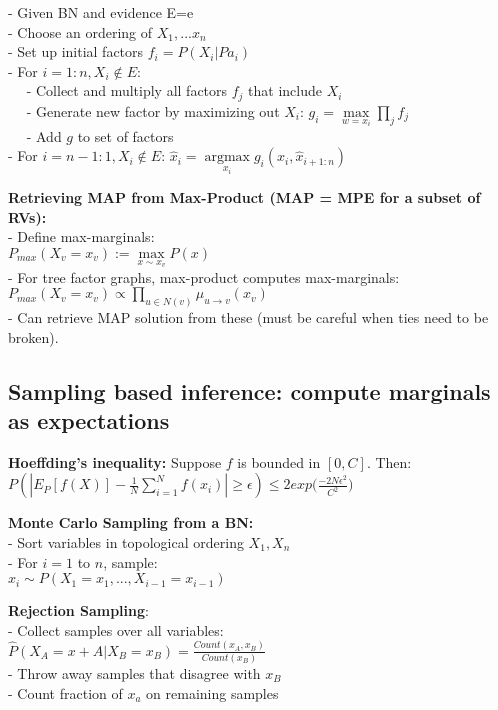 \iffalse
- Given BN and evidence E=e\\
- Choose an ordering of $X_1, ... x_n$\\
- Set up initial factors $f_i=P(X_i|Pa_i)$\\
- For $i=1:n, X_i \notin  E$:\\
$\quad$ - Collect and multiply all factors $f_j$ that include $X_i$\\
$\quad$ - Generate new factor by maximizing out $X_i$:
        $g_i=\underset{w=x_i}{\operatorname{max}}\prod_j f_j$\\
$\quad$ - Add $g$ to set of factors\\
- For $i=n-1:1, X_i\notin E$:
    $\hat{x}_i=\underset{x_i}{\operatorname{argmax}}g_i(x_i, \hat{x}_{i+1:n})$

\textbf{Retrieving MAP from Max-Product (MAP = MPE for a subset of RVs):}\\
- Define max-marginals:\\
    $P_{max}(X_v=x_v):=\underset{x\sim x_v}{\operatorname{max}}P(x)$\\
- For tree factor graphs, max-product computes max-marginals:\\
    $P_{max}(X_v=x_v)	\propto \prod_{u \in N(v)} \mu_{u \rightarrow v}(x_v)$\\
- Can retrieve MAP solution from these (must be careful when ties need to be broken).


\subsection{Sampling based inference: compute marginals as expectations}
\textbf{Hoeffding's inequality:} Suppose $f$ is bounded in $[0, C]$. Then:\\
$P(|E_P[f(X)]-\frac{1}{N}\sum_{i=1}^N f(x_i)|\geq\epsilon) \leq 2exp\big( \frac{-2N\epsilon^2}{C^2}\big)$

\textbf{Monte Carlo Sampling from a BN:}\\
- Sort variables in topological ordering $X_1, X_n$\\
- For $i=1$ to $n$, sample:\\
$x_i \sim P(X_1=x_1, ..., X_{i-1}=x_{i-1})$

\textbf{Rejection Sampling}:\\
- Collect samples over all variables:\\
    $\hat{P}(X_A =x+A | X_B=x_B)=\frac{Count(x_A, x_B)}{Count(x_B)}$\\
- Throw away samples that disagree with $x_B$\\
- Count fraction of $x_a$ on remaining samples


